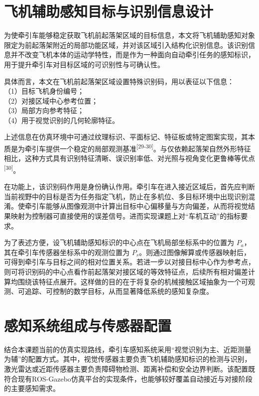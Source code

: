 \section{飞机辅助感知目标与识别信息设计}

为使牵引车能够稳定获取飞机前起落架区域的目标信息，本文将飞机辅助感知对象限定为前起落架附近的局部功能区域，并对该区域引入结构化识别信息。该识别信息并不改变飞机本体的运动学特性，而是作为一种面向自动牵引任务的感知标识，用于提升牵引车对目标区域的可识别性与可确认性。

具体而言，本文在飞机前起落架区域设置特殊识别码，用以表征以下信息：\\
（1）目标飞机身份编号；\\
（2）对接区域中心参考位置；\\
（3）局部方向参考特征；\\
（4）用于视觉识别的几何轮廓特征。

上述信息在仿真环境中可通过纹理标识、平面标记、特征板或特定图案实现，其本质是为牵引车提供一个稳定的局部观测基准\textsuperscript{[29-30]}。与仅依赖起落架自然外形特征相比，这种方式具有识别特征清晰、误识别率低、对光照与视角变化更鲁棒等优点\textsuperscript{[30]}。

在功能上，该识别码作用是身份确认作用。牵引车在进入接近区域后，首先应判断当前视野中的目标是否为任务指定飞机，防止在多机位、多目标环境中出现识别混淆。使牵引车能够从图像观测中计算出目标中心偏移量与方向偏差，从而将视觉结果映射为控制器可直接使用的误差信号。进而实现课题上对``车机互动''的指标要求。

为了表述方便，设飞机辅助感知标识的中心点在飞机局部坐标系中的位置为
\(P_{a}\)，其在牵引车传感器坐标系中的观测位置为
\(P_{s}\)。则通过图像解算或传感器映射后，可得到牵引车与目标之间的相对位置关系。若进一步以对接目标中心作为参考点，则可将识别码的中心点看作前起落架对接区域的等效特征点，后续所有相对偏差计算均围绕该特征点展开。这样做的目的在于将复杂的机械接触区域抽象为一个可观测、可追踪、可控制的数学目标，从而显著降低系统的感知复杂度。

\section{感知系统组成与传感器配置}

结合本课题当前的仿真实现路线，牵引车感知系统采用``视觉识别为主、近距测量为辅''的配置方式。其中，视觉传感器主要负责飞机辅助感知标识的检测与识别，激光雷达或近距传感器主要负责障碍物检测、距离补偿和安全边界判断。该配置既符合现有ROS-Gazebo仿真平台的实现条件，也能够较好覆盖自动接近与对接阶段的主要感知需求。

